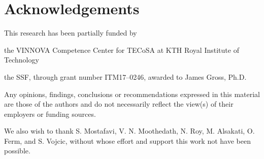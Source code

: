 \section*{Acknowledgements}\label{sec:acks}

This research has been partially funded by
\begin{enumerate*}[itemjoin={{; }}, itemjoin*={{; and }}]
    \item the VINNOVA Competence Center for \ac{TECoSA} at KTH Royal Institute of Technology
    \item the \ac{SSF}, through grant number ITM17--0246, awarded to James Gross, Ph.D.
\end{enumerate*}
Any opinions, findings, conclusions or recommendations expressed in this material are those of the authors and do not necessarily reflect the view(s) of their employers or funding sources.

We also wish to thank S. Mostafavi, V. N. Moothedath, N. Roy, M. Alsakati, O. Ferm, and S. Vojcic, without whose effort and support this work not have been possible.
